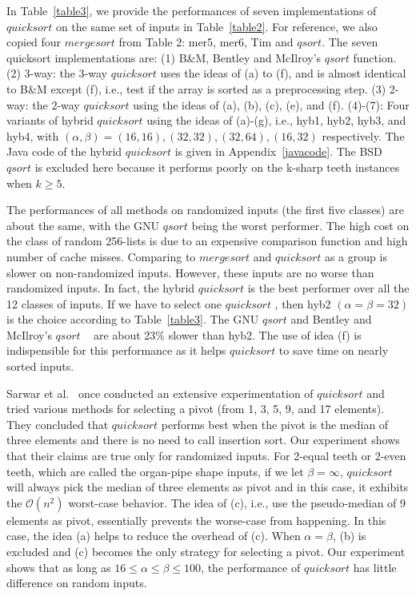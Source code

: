 \documentclass[AMA,STIX1COL]{WileyNJD-v2}
\newcommand{\qusort}{$quicksort$ }
\newcommand{\qsort}{$qsort$ }
\newcommand{\qsortn}{$qsort$}
\newcommand{\msort}{$mergesort$ }
\begin{document}
In Table~\ref{table3}, we provide the performances of seven implementations of \qusort on the same set of inputs in Table~\ref{table2}. 
For reference, we also copied four \msort from Table 2: mer5, mer6, Tim and \qsortn. 
The seven quicksort implementations are: (1) B\&M, Bentley and McIlroy’s \qsort function. (2) 3-way: the 3-way \qusort uses the ideas of (a) to (f), and is almost identical to B\&M except (f), i.e., test if the array is sorted as a preprocessing step. (3) 2-way: the 2-way \qusort using the ideas of (a), (b), (c), (e), and (f). (4)-(7): Four variants of hybrid \qusort using the ideas of (a)-(g), i.e., hyb1, hyb2, hyb3, and hyb4, with $(\alpha, \beta) = (16, 16), (32, 32), (32, 64), (16, 32)$ respectively. 
The Java code of the hybrid \qusort is given in Appendix~\ref{javacode}. 
The BSD \qsort is excluded here because it performs poorly on the k-sharp teeth instances when $k \geq 5$.

The performances of all methods on randomized inputs (the first five classes) are about the same, with the GNU \qsort being the worst performer. 
The high cost on the class of random 256-lists is due to an expensive comparison function and high number of cache misses. 
Comparing to \msort and \qusort as a group is slower on non-randomized inputs. 
However, these inputs are no worse than randomized inputs. 
In fact, the hybrid \qusort is the best performer over all the 12 classes of inputs. 
If we have to select one \qusort, then hyb2 $(\alpha = \beta = 32)$ is the choice according to Table~\ref{table3}. 
The GNU \qsort and Bentley and McIlroy’s \qsort~\cite{bentley1993engineering} are about 23\% slower than hyb2. 
The use of idea (f) is indispensible for this performance as it helps \qusort to save time on nearly sorted inputs. 

Sarwar et al.~\cite{sarwar1996engineering} once conducted an extensive experimentation of \qusort and tried various methods for selecting a pivot (from 1, 3, 5, 9, and 17 elements). 
They concluded that \qusort performs best when the pivot is the median of three elements and there is no need to call insertion sort. 
Our experiment shows that their claims are true only for randomized inputs. 
For 2-equal teeth or 2-even teeth, which are called the organ-pipe shape inputs, if we let $\beta = \infty$, \qusort will always pick the median of three elements as pivot and in this case, it exhibits the $\mathcal{O}(n^2)$ worst-case behavior. 
The idea of (c), i.e., use the pseudo-median of 9 elements as pivot, essentially prevents the worse-case from happening. 
In this case, the idea (a) helps to reduce the overhead of (c). When $\alpha = \beta$, (b) is excluded and (c) becomes the only strategy for selecting a pivot. 
Our experiment shows that as long as $16 \leq \alpha \leq \beta \leq 100$, the performance of \qusort has little difference on random inputs.
\end{document}

